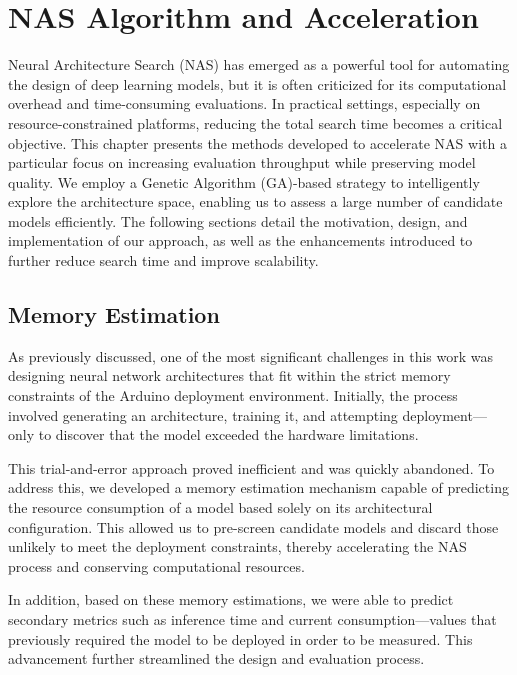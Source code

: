 \chapter{NAS Algorithm and Acceleration}


\begin{sloppypar}
Neural Architecture Search (NAS) has emerged as a powerful tool for automating the design of deep learning models, but it is often criticized for its computational overhead and time-consuming evaluations. In practical settings, especially on resource-constrained platforms, reducing the total search time becomes a critical objective. 
\newline
This chapter presents the methods developed to accelerate NAS with a particular focus on increasing evaluation throughput while preserving model quality. We employ a Genetic Algorithm (GA)-based strategy to intelligently explore the architecture space, enabling us to assess a large number of candidate models efficiently. The following sections detail the motivation, design, and implementation of our approach, as well as the enhancements introduced to further reduce search time and improve scalability.
\end{sloppypar}

\section{Memory Estimation}

As previously discussed, one of the most significant challenges in this work was designing neural network architectures that fit within the strict memory constraints of the Arduino deployment environment. Initially, the process involved generating an architecture, training it, and attempting deployment—only to discover that the model exceeded the hardware limitations. 

This trial-and-error approach proved inefficient and was quickly abandoned. To address this, we developed a memory estimation mechanism capable of predicting the resource consumption of a model based solely on its architectural configuration. This allowed us to pre-screen candidate models and discard those unlikely to meet the deployment constraints, thereby accelerating the NAS process and conserving computational resources.

In addition, based on these memory estimations, we were able to predict secondary metrics such as inference time and current consumption—values that previously required the model to be deployed in order to be measured. This advancement further streamlined the design and evaluation process.



